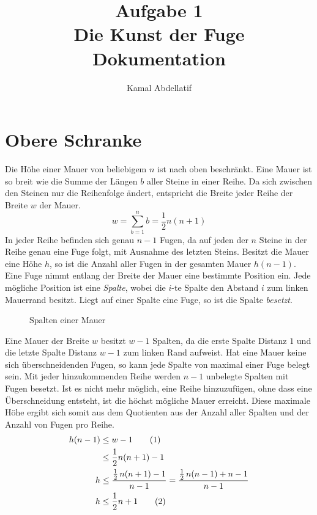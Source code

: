 \documentclass[a4paper, 12pt]{scrartcl}
\title{Aufgabe 1\\Die Kunst der Fuge\\Dokumentation}
\author{Kamal Abdellatif}
\date{}
\newcommand{\numberthis}{\addtocounter{equation}{1}\tag{\theequation}}
\begin{document}
\maketitle
\section{Obere Schranke}
Die Höhe einer Mauer von beliebigem $n$ ist nach oben beschränkt. Eine Mauer ist so breit wie die Summe der Längen $b$ aller Steine in einer Reihe. Da sich zwischen den Steinen nur die Reihenfolge ändert, entspricht die Breite jeder Reihe der Breite $w$ der Mauer.
\begin{equation}\label{eq:width}
	w = \sum_{b = 1}^n b = \frac{1}{2}n(n+1)
\end{equation}
In jeder Reihe befinden sich genau $n-1$ Fugen, da auf jeden der $n$ Steine in der Reihe genau eine Fuge folgt, mit Ausnahme des letzten Steins. Besitzt die Mauer eine Höhe $h$, so ist die Anzahl aller Fugen in der gesamten Mauer $h(n-1)$.\\
Eine Fuge nimmt entlang der Breite der Mauer eine bestimmte Position ein. Jede mögliche Position ist eine \emph{Spalte}, wobei die $i$-te Spalte den Abstand $i$ zum linken Mauerrand besitzt. Liegt auf einer Spalte eine Fuge, so ist die Spalte \emph{besetzt}.
\begin{figure}[H]
	\centering
	\caption{Spalten einer Mauer}
\end{figure}
Eine Mauer der Breite $w$ besitzt $w-1$ Spalten, da die erste Spalte Distanz $1$ und die letzte Spalte Distanz $w-1$ zum linken Rand aufweist.
Hat eine Mauer keine sich überschneidenden Fugen, so kann jede Spalte von maximal einer Fuge belegt sein. Mit jeder hinzukommenden Reihe werden $n-1$ unbelegte Spalten mit Fugen besetzt. Ist es nicht mehr möglich, eine Reihe hinzuzufügen, ohne dass eine Überschneidung entsteht, ist die höchst mögliche Mauer erreicht. Diese maximale Höhe ergibt sich somit aus dem Quotienten aus der Anzahl aller Spalten und der Anzahl von Fugen pro Reihe.
\begin{align*}
	h(n-1) &\le w-1 \numberthis\label{eq:hansatz}\\
	&\le \frac{1}{2}n(n+1) -1 \\
	h &\le \frac{\frac{1}{2}\,n(n+1)-1}{n-1} = \frac{\frac{1}{2}\,n(n-1)+n-1}{n-1} \\
	h &\le \frac{1}{2}n + 1 \numberthis\label{eq:schranke}
\end{align*}
\end{document}
